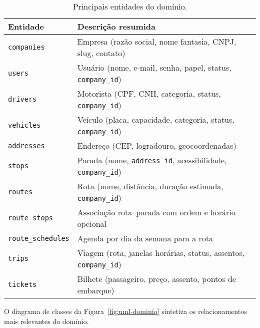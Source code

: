 \begin{table}[H]
  \centering
  \begin{tabular}{ll}
    \toprule
    \textbf{Entidade}         & \textbf{Descrição resumida}                                               \\
    \midrule
    \texttt{companies}        & Empresa (razão social, nome fantasia, CNPJ, slug, contato)                \\
    \texttt{users}            & Usuário (nome, e-mail, senha, papel, status, \texttt{company\_id})        \\
    \texttt{drivers}          & Motorista (CPF, CNH, categoria, status, \texttt{company\_id})             \\
    \texttt{vehicles}         & Veículo (placa, capacidade, categoria, status, \texttt{company\_id})      \\
    \texttt{addresses}        & Endereço (CEP, logradouro, geocoordenadas)                                \\
    \texttt{stops}            & Parada (nome, \texttt{address\_id}, acessibilidade, \texttt{company\_id}) \\
    \texttt{routes}           & Rota (nome, distância, duração estimada, \texttt{company\_id})            \\
    \texttt{route\_stops}     & Associação rota–parada com ordem e horário opcional                       \\
    \texttt{route\_schedules} & Agenda por dia da semana para a rota                                      \\
    \texttt{trips}            & Viagem (rota, janelas horárias, status, assentos, \texttt{company\_id})   \\
    \texttt{tickets}          & Bilhete (passageiro, preço, assento, pontos de embarque)                  \\
    \bottomrule
  \end{tabular}
  \caption{Principais entidades do domínio.}
  \label{tab:principais-entidades}
\end{table}

O diagrama de classes da Figura~\ref{fig:uml-dominio} sintetiza os relacionamentos mais relevantes do domínio.

